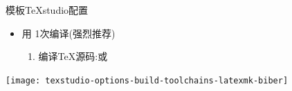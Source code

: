 \documentclass[xcolor=svgnames, t, aspectratio=169]{ctexbeamer}
\begin{document}
\begin{frame}{\nwafuthesis 模板}{TeXstudio配置}
  \stretchon
  \begin{itemize}
  \item 用 \alert{1次}编译(\alert{强烈推荐})
    \begin{enumerate}
    \item {} 编译\TeX 源码:或
    \end{enumerate}
  \end{itemize}
  \centering
  \begin{annotatedFigure}
    {\texttt{[image: texstudio-options-build-toolchains-latexmk-biber]}}
  \end{annotatedFigure}
  \stretchoff
\end{frame}
\end{document}
